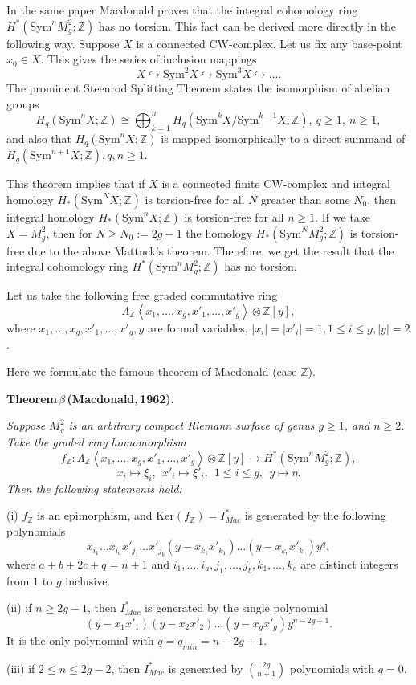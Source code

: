 \documentclass[a4paper,14pt]{article}
\newcommand{\Sym}{\mathrm{Sym}}
\newcommand{\Z}{\mathbb{Z}}
\begin{document}
\medskip




In the same paper \cite{Mac1} Macdonald proves that the integral cohomology ring $H^*(\Sym^n M^2_g;\Z)$ has no torsion. This fact can be derived more directly in the following way. Suppose $X$ is a connected CW-complex. Let us fix any base-point $x_0\in X$. This gives the series of inclusion mappings 
$$
X\hookrightarrow \Sym^2 X \hookrightarrow \Sym^3 X \hookrightarrow \ldots.
$$ 
The prominent Steenrod Splitting Theorem states the isomorphism of abelian groups 
$$
H_q(\Sym^n X;\Z)\cong \bigoplus_{k=1}^{n} H_q(\Sym^k X/\Sym^{k-1} X;\Z), \ q\ge 1, \ n\ge 1,
$$ 
and also that $H_q(\Sym^n X;\Z)$ is mapped isomorphically to a direct summand of $H_q(\Sym^{n+1} X;\Z),  q, n\ge 1$. 


\noindent This theorem implies that if $X$ is a connected finite CW-complex and integral homology $H_*(\Sym^N X;\Z)$ is torsion-free for all $N$ greater than some $N_0$, then integral homology $H_*(\Sym^n X;\Z)$ is torsion-free for all $n\ge 1$. 
\noindent If we take $X=M^2_g$, then for $N\ge N_0:= 2g-1$ the homology $H_*(\Sym^N M^2_g;\Z)$ is torsion-free due to the above Mattuck's theorem. Therefore, we get the result that the integral cohomology ring $H^*(\Sym^n M^2_g;\Z)$ has no torsion.

Let us take the following free graded commutative ring
$$
\Lambda_{\Z} \left< x_1,\ldots,x_g,x'_1,\ldots,x'_g \right>\otimes \Z[y],
$$
where $x_1,\ldots,x_g,x'_1,\ldots,x'_g,y$ are formal variables, $|x_i|=|x'_i|=1, 1\le i\le g, |y|=2$. 

Here we formulate the famous theorem of Macdonald \cite{Mac1} (case $\Z$). 

{\bf Theorem\,$\beta$\,(Macdonald,\,1962).} {\it Suppose $M^2_g$ is an arbitrary compact Riemann surface of genus $g\ge 1$, and $n\ge 2$. Take the graded ring homomorphism
$$
f_{\Z}: \Lambda_{\Z} \left< x_1,\ldots,x_g,x'_1,\ldots,x'_g \right>\otimes \Z[y] \to H^*(\Sym^n M^2_g;\Z),
$$
$$
x_i \mapsto \xi_i, \ \  x'_i \mapsto \xi'_i, \ \ 1\le i\le g, \ \ y \mapsto \eta.
$$
Then the following statements hold: 

(i) $f_{\Z}$ is an epimorphism, and $\mathrm{Ker}(f_{\Z}) = I^*_{Mac}$ is generated by the following polynomials
$$
x_{i_1}\ldots x_{i_a}x'_{j_1}\ldots x'_{j_b} (y - x_{k_1}x'_{k_1})\ldots  (y - x_{k_c}x'_{k_c}) y^q,
$$
where $a+b+2c+ q=n+1$ and $i_1,\ldots,i_a,j_1,\ldots,j_b,k_1,\ldots,k_c$ are distinct integers from $1$ to $g$ inclusive.

(ii) if $n\ge 2g-1$, then $I^*_{Mac}$ is generated by the single polynomial
$$
(y - x_1x'_1)(y - x_2x'_2)\ldots (y - x_g x'_g) y^{n-2g+1}.
$$
It is the only polynomial with $q=q_{min}=n-2g+1$.

(iii) if $2\le n\le 2g-2$, then $I^*_{Mac}$ is generated by $\binom{2g}{n+1}$ polynomials with $q=0$.}
\end{document}
